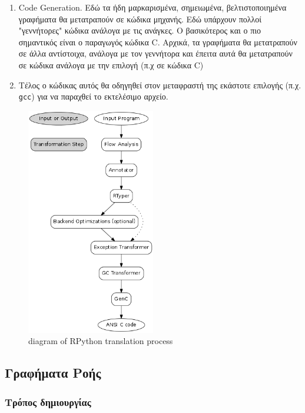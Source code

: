 \begin{enumerate}
\item Code Generation. Εδώ τα ήδη μαρκαρισμένα, σημειωμένα, βελτιστοποιημένα
γραφήματα θα μετατραπούν σε κώδικα μηχανής. Εδώ υπάρχουν πολλοί "γεννήτορες"
κώδικα ανάλογα με τις ανάγκες. Ο βασικότερος και ο πιο σημαντικός είναι ο
παραγωγός κώδικα C. Αρχικά, τα γραφήματα θα μετατραπούν σε άλλα αντίστοιχα,
ανάλογα με τον γεννήτορα και έπειτα αυτά θα μετατραπούν σε κώδικα ανάλογα με την
επιλογή (π.χ σε κώδικα C)

\item Τέλος ο κώδικας αυτός θα οδηγηθεί στον μεταφραστή της εκάστοτε επιλογής
(π.χ. \texttt{gcc}) για να παραχθεί το εκτελέσιμο αρχείο.

\end{enumerate}

\begin{figure}[h]
\centering
\includegraphics[width=0.5\textwidth]{diagram.png}
\caption{diagram of RPython translation process}
\label{figure-1}
\end{figure}

\subsection{Γραφήματα Ροής}

\subsubsection{Τρόπος δημιουργίας}

